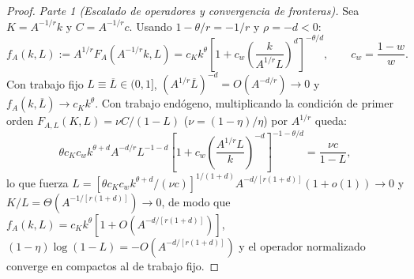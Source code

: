 \documentclass[11pt,letterpaper]{article}
\theoremstyle{plain}
\begin{document}
\begin{proof}
\emph{Parte 1 (Escalado de operadores y convergencia de fronteras).} Sea $K=A^{-1/r}k$ y $C=A^{-1/r}c$. Usando $1-\theta/r=-1/r$ y $\rho=-d<0$:
\[
f_A(k,L) := A^{1/r}F_A(A^{-1/r}k,L) = c_K k^\theta \left[1 + c_w\left(\frac{k}{A^{1/r}L}\right)^d\right]^{-\theta/d}, \qquad c_w = \frac{1-w}{w}.
\]
Con trabajo fijo $L\equiv\overline{L}\in(0,1]$, $(A^{1/r}\overline{L})^{-d}=O(A^{-d/r})\to 0$ y $f_A(k,\overline{L})\to c_K k^\theta$. Con trabajo endógeno, multiplicando la condición de primer orden $F_{A,L}(K,L)=\nu C/(1-L)$ ($\nu=(1-\eta)/\eta$) por $A^{1/r}$ queda:
\[
\theta c_K c_w k^{\theta+d} A^{-d/r} L^{-1-d}\left[1+c_w\left(\frac{A^{1/r}L}{k}\right)^{-d}\right]^{-1-\theta/d} = \frac{\nu c}{1-L},
\]
lo que fuerza $L = [\theta c_K c_w k^{\theta+d}/(\nu c)]^{1/(1+d)} A^{-d/[r(1+d)]}(1+o(1))\to 0$ y $K/L=\Theta(A^{-1/[r(1+d)]})\to 0$, de modo que $f_A(k,L)=c_K k^\theta[1+O(A^{-d/[r(1+d)]})]$, $(1-\eta)\log(1-L)=-O(A^{-d/[r(1+d)]})$ y el operador normalizado converge en compactos al de trabajo fijo.


\end{proof}
\end{document}

